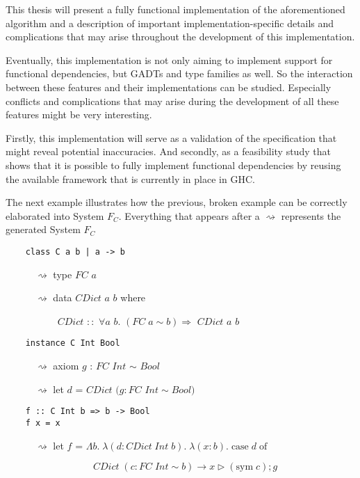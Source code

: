 This thesis will present a fully functional implementation of the aforementioned
algorithm and a description of important implementation-specific details and
complications that may arise throughout the development of this implementation.

Eventually, this implementation is not only aiming to implement support for functional dependencies,
but GADTs and type families as well. So the interaction between these features
and their implementations can be studied. Especially conflicts and complications
that may arise during the development of all these features might be very
interesting.

Firstly, this implementation will serve as a validation of the specification
that might reveal potential inaccuracies. And secondly, as a feasibility study
that shows that it is possible to fully implement functional dependencies by
reusing the available framework that is currently in place in GHC.

The next example illustrates how the previous, broken example can be correctly
elaborated into System $F_C$. Everything that appears after a $\rightsquigarrow$
represents the generated System $F_C$
\begin{verbatim}
    class C a b | a -> b
\end{verbatim}

$\quad\quad\quad\rightsquigarrow$ type $FC$ $a$

$\quad\quad\quad\rightsquigarrow$ data $CDict$ $a$ $b$ where

$\quad\quad\quad\quad\quad$ $CDict$ $::$ $\forall a$ $b$. $(FC \; a \sim b)
\Rightarrow$ $CDict$ $a$ $b$

\begin{verbatim}
    instance C Int Bool
\end{verbatim}
$\quad\quad\quad\rightsquigarrow$ axiom $g$ : $FC$ $Int$ $\sim$ $Bool$

$\quad\quad\quad\rightsquigarrow$ let $d$ = $CDict$ $(g : FC$ $Int \sim Bool)$

\begin{verbatim}
    f :: C Int b => b -> Bool
    f x = x
\end{verbatim}
$\quad\quad\quad\rightsquigarrow$ let $f$ =
$\Lambda b. \; \lambda (d : CDict \; Int \; b). \;\lambda (x : b). \; \text{case} \; d
\; \text{of}$

$\quad\quad\quad\quad\quad\quad\quad\quad\quad %
CDict \; (c : FC \; Int \sim b ) \rightarrow x \triangleright (\text{sym} \; c) ; g$

